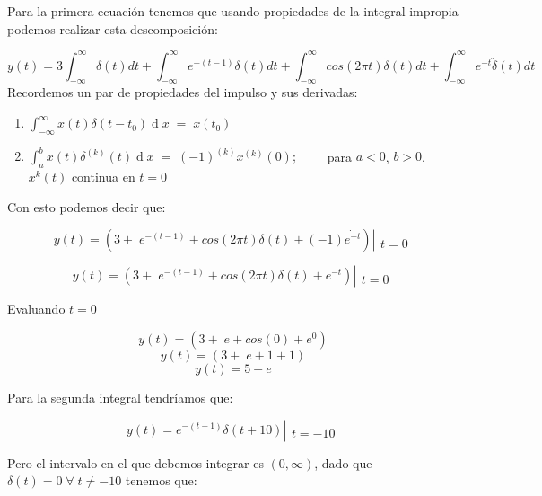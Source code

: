 \documentclass[10pt,a4paper]{report}
\begin{document}
Para la primera ecuación tenemos que usando propiedades de la integral impropia podemos realizar esta descomposición:

\[ y(t)=3\int_{-\infty }^{\infty }\delta (t)dt+\int_{-\infty }^{\infty }e^{-(t-1)}\delta (t)dt+\int_{-\infty }^{\infty }cos(2\pi t)\dot{\delta}(t)dt+\int_{-\infty }^{\infty }e^{-t}\ddot{\delta}(t)dt \]
Recordemos un par de propiedades del impulso y sus derivadas:
\begin{enumerate}

  \item $\int_{-\infty}^\infty x\left(t\right)\delta\left(t-t_0\right)\operatorname dx\;=\;x\left(t_0\right)$
  
  \item $\int_a^bx\left(t\right)\delta^{\left(k\right)}\left(t\right)\operatorname dx\;=\;\left(-1\right)^{\left(k\right)}x^{\left(k\right)}\left(0\right); \qquad$ para $a<0$, $b>0$, $x^k\left(t\right)$ continua en $t=0$

\end{enumerate}
Con esto podemos decir que:

\[ y\left(t\right) = \left(3+\;e^{-\left(t-1\right)}+cos\left(2\pi t\right)\delta\left(t\right)+\left(-1\right)\dot{e^{-t}}\right)\left|\begin{array}{l}\\t=0\end{array}\right. \]

\[ y\left(t\right) = \left(3+\;e^{-\left(t-1\right)}+cos\left(2\pi t\right)\delta\left(t\right)+{e^{-t}}\right)\left|\begin{array}{l}\\t=0\end{array}\right. \]

Evaluando $t=0$

\[ y\left(t\right) = \left(3+\;e+cos\left(0\right)+e^0\right) \]
\[ y\left(t\right) = \left(3+\;e+1+1\right) \]
\[ y\left(t\right) = 5+e \]

Para la segunda integral tendríamos que:

\[ y\left(t\right)= e^{-\left(t-1\right)}\delta\left(t+10\right)\left|\begin{array}{l}\\t=-10\end{array}\right. \]

Pero el intervalo en el que debemos integrar es $\left(0,\infty\right)$, dado que $\delta\left(t\right) = 0 \; \forall \; t \neq -10$ tenemos que:
\end{document}
